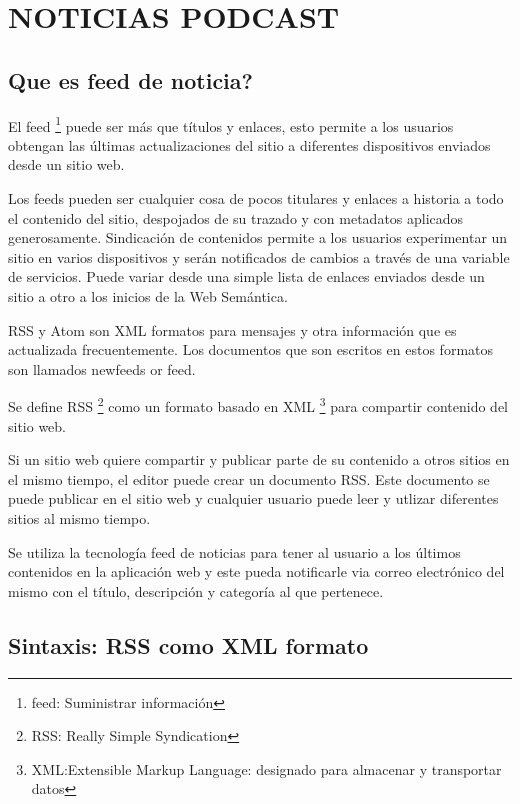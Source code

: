 \chapter{NOTICIAS PODCAST}

\section{\textquestiondown Que es feed de noticia?}

El feed \footnote{feed: Suministrar informaci\'{o}n} puede ser m\'{a}s que t\'{i}tulos
y enlaces, esto permite a los usuarios obtengan las \'{u}ltimas actualizaciones del sitio
a diferentes dispositivos enviados desde un sitio web.

Los feeds pueden ser cualquier cosa de pocos titulares y enlaces a historia a todo
el contenido del sitio, despojados de su trazado y con metadatos aplicados generosamente.
Sindicaci\'{o}n de contenidos permite a los usuarios experimentar un sitio en varios 
dispositivos y ser\'{a}n notificados de cambios a trav\'{e}s de una variable de servicios. 
Puede variar desde una simple lista de enlaces enviados desde un sitio a otro a los 
inicios de la Web Sem\'{a}ntica.\cite{hammersley2005developing}

RSS y Atom son XML formatos para mensajes y otra informaci\'{o}n que es actualizada 
frecuentemente. Los documentos que son escritos en estos formatos son llamados newfeeds
or feed.\cite{wittenbrink2005rss}

Se define RSS \footnote{RSS: Really Simple Syndication} como un formato basado en XML 
\footnote{XML:Extensible Markup Language: designado para almacenar y transportar datos} 
para compartir contenido del sitio web.

Si un sitio web quiere compartir y publicar parte de su contenido a otros sitios en el
mismo tiempo, el editor puede crear un documento RSS. Este documento se puede publicar
en el sitio web y cualquier usuario puede leer y utlizar diferentes sitios al mismo 
tiempo. \cite{zeki2004rss}

Se utiliza la tecnolog\'{i}a feed de noticias para tener al usuario a los \'{u}ltimos
contenidos en la aplicaci\'{o}n web y este pueda notificarle via correo electr\'{o}nico
del mismo con el t\'{i}tulo, descripci\'{o}n y categor\'{i}a al que pertenece.

\section{Sintaxis: RSS como XML formato}

